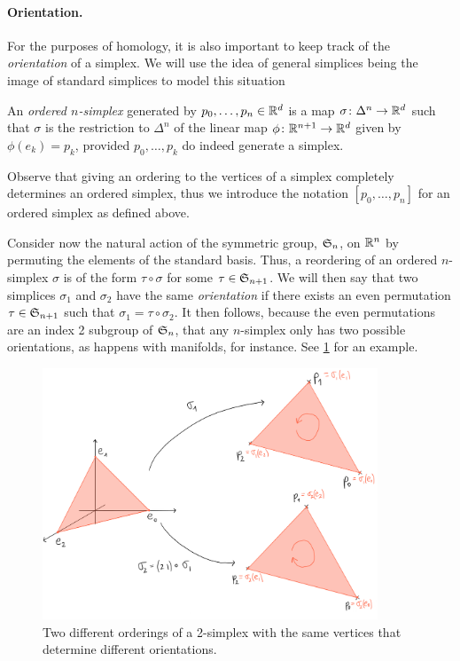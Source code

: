 \documentclass[../main.tex]{subfiles}
\begin{document}
\paragraph{Orientation.}
For the purposes of homology, it is also important to keep track of the \emph{orientation} of a
simplex. We will use the idea of general simplices being the image of standard simplices
to model this situation
\begin{definition}
	An \emph{ordered \( n \)-simplex} generated by \( p_0, \dots, p_n \in \R^d \) is a map
	\( \sigma \colon \Delta^n \to \R^d \) such that \( \sigma \) is the restriction to \(
	\Delta^n \) of the linear map \( \phi \colon \R^{n+1} \to \R^d \) given by \( \phi(e_k)
	= p_k \), provided \( p_0, \dots, p_k \) do indeed generate a simplex. 
\end{definition}
Observe that giving an ordering to the vertices of a simplex completely determines an
ordered simplex, thus we introduce the notation \( [p_0, \dots, p_n] \) for an ordered
simplex as defined above. 

Consider now the natural action of the symmetric group, \( \S_n \), on \( \R^n \) by permuting the elements of
the standard basis. Thus, a reordering of an ordered \( n \)-simplex \( \sigma \) is of
the form \( \tau \circ \sigma \) for some \( \tau \in \S_{n+1} \). We will then say that
two simplices \( \sigma_1 \) and \( \sigma_2 \) have the same \emph{orientation} if there
exists an even permutation \( \tau \in \S_{n+1} \) such that \( \sigma_1 = \tau \circ
\sigma_2 \). It then follows, because the even permutations are an index 2 subgroup of \(
\S_n\), that any \( n \)-simplex only has two possible orientations, as happens with
manifolds, for instance. See \cref{fig:orientation} for an example. 

\begin{figure}[htb]
	\centering
	\includegraphics[width = 10cm]{figs/orientation}
	\caption{Two different orderings of a 2-simplex with the same vertices that determine
	different orientations.}
	\label{fig:orientation}
\end{figure}
\end{document}
